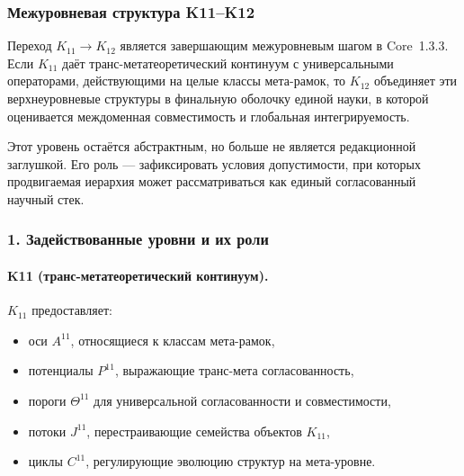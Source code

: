 
\subsubsection{Межуровневая структура K11–K12}
\label{sec:crossk-k11-k12}

Переход $K_{11} \rightarrow K_{12}$ является завершающим межуровневым шагом
в Core~1.3.3. Если $K_{11}$ даёт транс-метатеоретический континуум с
универсальными операторами, действующими на целые классы мета-рамок, то $K_{12}$
объединяет эти верхнеуровневые структуры в финальную оболочку единой науки,
в которой оценивается междоменная совместимость и глобальная интегрируемость.

Этот уровень остаётся абстрактным, но больше не является редакционной заглушкой.
Его роль — зафиксировать условия допустимости, при которых продвигаемая
иерархия может рассматриваться как единый согласованный научный стек.

\subsubsection{1. Задействованные уровни и их роли}

\paragraph{K11 (транс-метатеоретический континуум).}
$K_{11}$ предоставляет:
\begin{itemize}
  \item оси $A^{11}$, относящиеся к классам мета-рамок,
  \item потенциалы $P^{11}$, выражающие транс-мета согласованность,
  \item пороги $\Theta^{11}$ для универсальной согласованности и совместимости,
  \item потоки $J^{11}$, перестраивающие семейства объектов $K_{11}$,
  \item циклы $C^{11}$, регулирующие эволюцию структур на мета-уровне.
\end{itemize}

